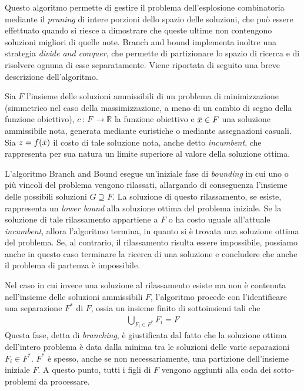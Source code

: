 Questo algoritmo permette di gestire il problema dell'esplosione combinatoria mediante il \textit{pruning} di intere porzioni dello spazio delle soluzioni, che può essere effettuato quando si riesce a dimostrare che queste ultime non contengono soluzioni migliori di 
quelle note. Branch and bound implementa inoltre una strategia \textit{divide and conquer}, che permette di partizionare lo spazio di 
ricerca e di risolvere ognuna di esse separatamente. Viene riportata di seguito una breve descrizione dell'algoritmo.

Sia $F$ l'insieme delle soluzioni ammissibili di un problema di minimizzazione (simmetrico nel caso della massimizzazione, a meno di un 
cambio di segno della funzione obiettivo), $c \, : \, F \, \rightarrow \mathbb{R} $ la funzione obiettivo e $\Bar{x} \in F$ una 
soluzione ammissibile nota, generata mediante euristiche o mediante assegnazioni casuali. Sia $z=f(\Bar{x})$ il costo di tale soluzione
nota, anche detto \textit{incumbent}, che rappresenta per sua natura un limite superiore al valore della soluzione ottima. 

L'algoritmo Branch and Bound esegue un'iniziale fase di \textit{bounding} in cui uno o più vincoli del problema vengono rilassati, allargando di conseguenza l'insieme delle possibili soluzioni $G \supseteq F$. La soluzione di questo rilassamento, se esiste,
rappresenta un \textit{lower bound} alla soluzione ottima del problema iniziale. Se la soluzione di tale rilassamento appartiene a $F$
o ha costo uguale all'attuale \textit{incumbent}, allora l'algoritmo termina, in quanto si è trovata una soluzione ottima del problema.
Se, al contrario, il rilassamento risulta essere impossibile, possiamo anche in questo caso terminare la ricerca di una soluzione e 
concludere che anche il problema di partenza è impossibile.

Nel caso in cui invece una soluzione al rilassamento esiste ma non è contenuta nell'insieme delle soluzioni ammissibili $F$,
l'algoritmo procede con l'identificare una separazione $F^*$ di $F$, ossia un insieme finito di sottoinsiemi tali che
\begin{align*}
\bigcup_{F_i \in F^*} F_{i} = F
\end{align*}
Questa fase, detta di \textit{branching}, è giustificata dal fatto che la soluzione ottima dell'intero problema è data dalla minima
tra le soluzioni delle varie separazioni $F_i \in F^*$. $F^*$ è spesso, anche se non necessariamente, una partizione dell'insieme 
iniziale $F$. A questo punto, tutti i figli di $F$ vengono aggiunti alla coda dei sotto-problemi da processare.

